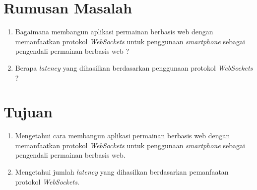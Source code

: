 

\section{Rumusan Masalah}
\label{sec:rumusan}

\begin{enumerate}
	\item Bagaimana membangun aplikasi permainan berbasis web dengan memanfaatkan protokol \textit{WebSockets} untuk penggunaan \textit{smartphone} sebagai pengendali permainan berbasis web ?
	\item Berapa \textit{latency} yang dihasilkan berdasarkan penggunaan protokol \textit{WebSockets} ? 
\end{enumerate}


\section{Tujuan}
\label{sec:tujuan}
\begin{enumerate}
	\item Mengetahui cara membangun aplikasi permainan berbasis web dengan memanfaatkan protokol \textit{WebSockets} untuk penggunaan \textit{smartphone} sebagai pengendali permainan berbasis web.
	\item Mengetahui jumlah \textit{latency} yang dihasilkan berdasarkan pemanfaatan protokol \textit{WebSockets}.
\end{enumerate}


